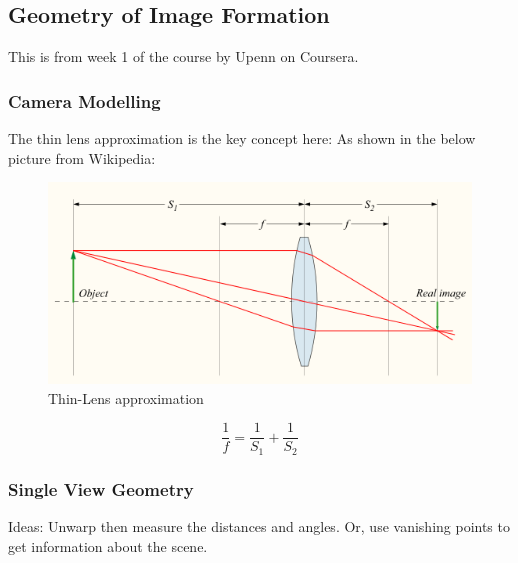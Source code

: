 \graphicspath{ {./Online-Courses/Coursera/Robotics-perception/} }
\subsection{Geometry of Image Formation}
This is from week 1 of the course by Upenn on Coursera.
\subsubsection{Camera Modelling}
The thin lens approximation is the key concept here:
As shown in the below picture from Wikipedia:
\begin{figure}[H]
    \caption{Thin-Lens approximation}
    \centering
    \includegraphics[width=\textwidth]{"thin lens"}
\end{figure}
\begin{equation}
    \frac{1}{f}=\frac{1}{S_1}+\frac{1}{S_2}
\end{equation}
\subsubsection{Single View Geometry}
Ideas: Unwarp then measure the distances and angles. Or, use vanishing points to get information about the scene.
